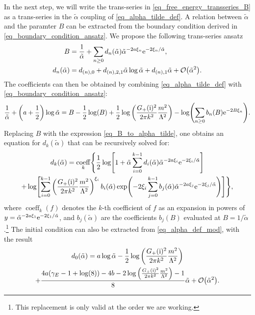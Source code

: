 \documentclass[a4paper,11pt]{article}
\theoremstyle{definition}
\DeclareMathOperator{\coeff}{coeff}
\newcommand{\re}{{\rm e}}
\newcommand{\ri}{{\rm i}}
\begin{document}
In the next step, we will write the trans-series in \eqref{eq_free_energy_transseries_B} as a trans-series in the $\tilde\alpha$ coupling of \eqref{eq_alpha_tilde_def}. A relation between $\tilde{\alpha}$ and the paramter $B$ can be extracted from the boundary condition derived in \eqref{eq_boundary_condition_ansatz}. We propose the following trans-series ansatz
\begin{equation}
\begin{aligned}
B &= \frac{1}{\tilde{\alpha}} + \sum_{n\ge 0} d_n(\tilde{\alpha}) \tilde{\alpha}^{-2a\xi_n} \re^{-2\xi_n/\tilde{\alpha}},\\
d_n(\tilde{\alpha}) &= d_{(n),0} + d_{(n),2,1} \tilde{\alpha} \log\tilde{\alpha} + d_{(n),1}\tilde{\alpha} + \mathcal{O}\big(\tilde{\alpha}^2\big).
\end{aligned}
\label{eq_B_to_alpha_tilde}
\end{equation}
The coefficients can then be obtained by combining \eqref{eq_alpha_tilde_def} with \eqref{eq_boundary_condition_ansatz}:
\begin{equation}
\frac{1}{\tilde{\alpha}} + \left( a + \frac{1}{2} \right)\log\tilde{\alpha} = B - \frac{1}{2}\log(B) + \frac{1}{2}\log\left( \frac{G_+(\ri)^2}{2\pi k^2} \frac{m^2}{\Lambda^2} \right) - \log\Biggl( \sum_{n\ge 0} b_n(B) \re^{-2B\xi_n} \Biggr).
\label{eq_alpha_def_mod}
\end{equation}
Replacing $B$ with the expression \eqref{eq_B_to_alpha_tilde}, one obtains an equation for $d_k(\tilde{\alpha})$ that can be recursively solved for:
\begin{multline}
d_k(\tilde{\alpha}) = \coeff_k \Biggl\{ \frac{1}{2} \log\Biggl[ 1 + \tilde{\alpha} \sum_{i=0}^{k-1} d_i(\tilde{\alpha}) \tilde{\alpha}^{-2a\xi_i} \re^{-2\xi_i/\tilde{\alpha}}\Biggr] \\
+ \log\Biggl[ \sum_{i=0}^{k-1} \left( \frac{G_+(\ri)^2}{2\pi k^2} \frac{m^2}{\Lambda^2} \right)^{\xi_i} b_i(\tilde{\alpha})\exp\Biggl( -2\xi_i \sum_{j=0}^{k-1} b_j(\tilde{\alpha}) \tilde{\alpha}^{-2a\xi_j} \re^{-2\xi_j/\tilde{\alpha}} \Biggr)   \Biggr] \Biggr\},
\end{multline}
where $\coeff_k(f)$ denotes the $k$-th coefficient of $f$ as an expansion in powers of $y=\tilde{\alpha}^{-2a\xi_1} \re^{-2\xi_1/\tilde{\alpha}}$, and $b_j(\tilde{\alpha})$ are the coefficients $b_j(B)$ evaluated at $B=1/\tilde{\alpha}$.\footnote{This replacement is only valid at the order we are working.} The initial condition can also be extracted from \eqref{eq_alpha_def_mod}, with the result
\begin{multline}
d_0(\tilde{\alpha}) =  a \log \tilde{\alpha} - \frac{1}{2}\log\left( \frac{G_+(\ri)^2}{2\pi k^2} \frac{m^2}{\Lambda^2} \right)\\
+ \frac{4 a (\gamma_E -1+\log (8))-4 b-2 \log\left( \frac{G_+(\ri)^2}{2\pi k^2} \frac{m^2}{\Lambda^2} \right)-1}{8} \tilde{\alpha} + \mathcal{O}\big(\tilde{\alpha}^2\big).
\end{multline}
\end{document}

